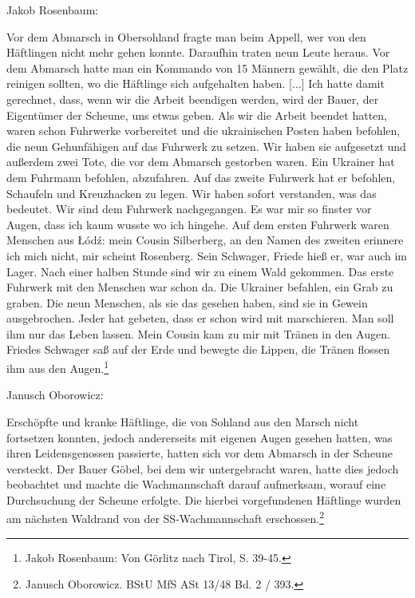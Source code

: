 Jakob\label{rosenbaum} Rosenbaum:
\begin{leftbar}   
Vor dem Abmarsch in Obersohland fragte man beim Appell, wer von den Häftlingen nicht mehr gehen konnte. Daraufhin traten neun Leute heraus.
Vor dem Abmarsch hatte man ein Kommando von 15 Männern gewählt, die den Platz reinigen sollten, wo die Häftlinge sich aufgehalten haben. [...] Ich hatte damit gerechnet, dass, wenn wir die Arbeit beendigen werden, wird der Bauer, der Eigentümer der Scheune, uns etwas geben. Als wir die Arbeit beendet hatten, waren schon Fuhrwerke vorbereitet und die ukrainischen Posten haben befohlen, die neun Gehunfähigen auf das Fuhrwerk zu setzen. Wir haben sie aufgesetzt und außerdem zwei Tote, die vor dem Abmarsch gestorben waren. Ein Ukrainer hat dem Fuhrmann befohlen, abzufahren. Auf das zweite Fuhrwerk hat er befohlen, Schaufeln und Kreuzhacken zu legen. Wir haben sofort verstanden, was das bedeutet. Wir sind dem Fuhrwerk nachgegangen. Es war mir so finster vor Augen, dass ich kaum wusste wo ich hingehe. Auf dem ersten Fuhrwerk waren Menschen aus \L \'od\'z: mein Cousin Silberberg, an den Namen des zweiten erinnere ich mich nicht, mir scheint Rosenberg. Sein Schwager, Friede hieß er, war auch im Lager. Nach einer halben Stunde sind wir zu einem Wald gekommen. Das erste Fuhrwerk mit den Menschen war schon da. Die Ukrainer befahlen, ein Grab zu graben. Die neun Menschen, als sie das gesehen haben, sind sie in Gewein ausgebrochen. Jeder hat gebeten, dass er schon wird mit marschieren. Man soll ihm nur das Leben lassen. Mein Cousin kam zu mir mit Tränen in den Augen. 
Friedes Schwager saß auf der Erde und bewegte die Lippen, die Tränen flossen ihm aus den Augen.\footnote{Jakob Rosenbaum: Von Görlitz nach Tirol, S. 39-45.}
\end{leftbar}
Janusch Oborowicz:
\begin{leftbar}   
Erschöpfte und kranke Häftlinge, die von Sohland aus den Marsch nicht fortsetzen konnten, jedoch andererseits mit eigenen Augen gesehen hatten, was ihren Leidensgenossen passierte, hatten sich vor dem Abmarsch in der Scheune versteckt. Der Bauer Göbel, bei dem wir untergebracht waren, hatte dies jedoch beobachtet und machte die Wachmannschaft darauf aufmerksam, worauf eine Durchsuchung der Scheune erfolgte. Die hierbei vorgefundenen Häftlinge wurden am nächsten Waldrand von der SS-Wachmannschaft erschossen.\footnote{Janusch Oborowicz. BStU MfS ASt 13/48 Bd. 2 / 393. }
\end{leftbar}

